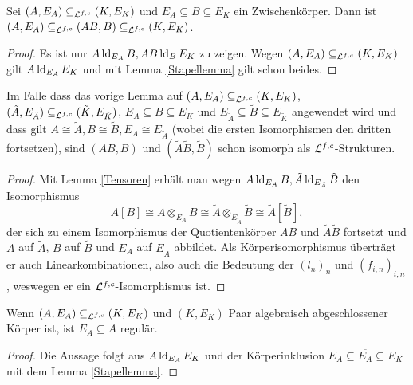     \begin{lemma}\label{E-Erw}
    	Sei $(A,E_A)\subseteq_{\mathcal{L}^{f,c}}(K,E_K)$ und $E_A\subseteq B\subseteq E_K$ ein Zwischenkörper. Dann ist $(A,E_A)\subseteq_{\mathcal{L}^{f,c}}(AB,B)\subseteq_{\mathcal{L}^{f,c}}(K,E_K)$.
    \end{lemma}
    \begin{proof}
    	Es ist nur $A\operatorname{ld}_{E_A}B,AB\operatorname{ld}_BE_K$ zu zeigen. Wegen $(A,E_A)\subseteq_{\mathcal{L}^{f,c}}(K,E_K)$ gilt $A\operatorname{ld}_{E_A}E_K$ und mit Lemma \ref{Stapellemma} gilt schon beides.
    \end{proof}
    
    \begin{lemma}\label{Fortsetzungslemma}
    	Im Falle dass das vorige Lemma auf $(A,E_A)\subseteq_{\mathcal{L}^{f,c}}(K,E_K)$, $(\tilde{A},E_{\tilde{A}})\subseteq_{\mathcal{L}^{f,c}}(\tilde{K},E_{\tilde{K}})$, $E_A\subseteq B\subseteq E_K$ und $E_{\tilde{A}}\subseteq \tilde{B}\subseteq E_{\tilde{K}}$ angewendet wird und dass gilt $A\cong \tilde{A},B\cong \tilde{B},E_A\cong E_{\tilde{A}}$ (wobei die ersten Isomorphismen den dritten fortsetzen), sind $(AB,B)$ und $(\tilde{A}\tilde{B},\tilde{B})$ schon isomorph als $\mathcal{L}^{f,c}$-Strukturen.
    \end{lemma}
    \begin{proof}
    	Mit Lemma \ref{Tensoren} erhält man wegen $A\operatorname{ld}_{E_A}B,\tilde{A}\operatorname{ld}_{E_{\tilde{A}}}\tilde{B}$ den Isomorphismus $$A[B]\cong A\otimes_{E_A}B\cong \tilde{A}\otimes_{E_{\tilde{A}}}\tilde{B}\cong\tilde{A}[\tilde{B}],$$ der sich zu einem Isomorphismus der Quotientenkörper $AB$ und $\tilde{A}\tilde{B}$ fortsetzt und $A$ auf $\tilde{A}$, $B$ auf $\tilde{B}$ und $E_A$ auf $E_{\tilde{A}}$ abbildet. Als Körperisomorphismus überträgt er auch Linearkombinationen, also auch die Bedeutung der $(l_n)_n$ und $(f_{i,n})_{i,n}$, weswegen er ein $\mathcal{L}^{f,c}$-Isomorphismus ist.
    \end{proof}
    
    \begin{lemma}
    	Wenn $(A,E_A)\subseteq_{\mathcal{L}^{f,c}}(K,E_K)$ und $(K,E_K)$ Paar algebraisch abgeschlossener Körper ist, ist $E_A\subseteq A$ regulär.
    \end{lemma}
    \begin{proof}
    	Die Aussage folgt aus $A\operatorname{ld}_{E_A}E_K$ und der Körperinklusion $E_A\subseteq\overline{E_A}\subseteq E_K$ mit dem Lemma \ref{Stapellemma}.
    \end{proof}
    
